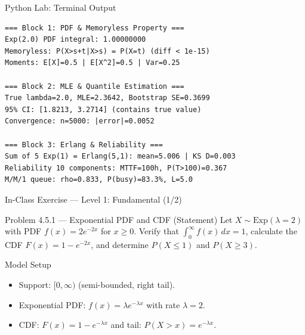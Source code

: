 \documentclass[aspectratio=169,xcolor={dvipsnames,table}]{beamer}
\begin{document}
\begin{frame}[fragile]{Python Lab: Terminal Output}
	\vspace{-0.1cm}
	\begin{block}{}
		\fontsize{4pt}{5pt}\selectfont
		\begin{verbatim}
=== Block 1: PDF & Memoryless Property ===
Exp(2.0) PDF integral: 1.00000000
Memoryless: P(X>s+t|X>s) = P(X=t) (diff < 1e-15)
Moments: E[X]=0.5 | E[X^2]=0.5 | Var=0.25

=== Block 2: MLE & Quantile Estimation ===
True lambda=2.0, MLE=2.3642, Bootstrap SE=0.3699
95% CI: [1.8213, 3.2714] (contains true value)
Convergence: n=5000: |error|=0.0052

=== Block 3: Erlang & Reliability ===
Sum of 5 Exp(1) = Erlang(5,1): mean=5.006 | KS D=0.003
Reliability 10 components: MTTF=100h, P(T>100)=0.367
M/M/1 queue: rho=0.833, P(busy)=83.3%, L=5.0
		\end{verbatim}
	\end{block}
\end{frame}

\begin{frame}{In-Class Exercise --- Level 1: Fundamental (1/2)}
	\vspace{-0.1cm}
	\begin{block}{Problem 4.5.1 --- Exponential PDF and CDF (Statement)}
		Let $X \sim \text{Exp}(\lambda = 2)$ with PDF $f(x) = 2e^{-2x}$ for $x \ge 0$. Verify that $\int_{0}^{\infty} f(x)\,dx = 1$, calculate the CDF $F(x) = 1 - e^{-2x}$, and determine $P(X \le 1)$ and $P(X \ge 3)$.
	\end{block}
	\vspace{0.15cm}
	\pause
	\begin{alertblock}{Model Setup}
		\begin{itemize}\itemsep=0.04cm
			\item Support: $[0, \infty)$ (semi-bounded, right tail).
			\item Exponential PDF: $f(x) = \lambda e^{-\lambda x}$ with rate $\lambda = 2$.
			\item CDF: $F(x) = 1 - e^{-\lambda x}$ and tail: $P(X > x) = e^{-\lambda x}$.
		\end{itemize}
	\end{alertblock}
\end{frame}
\end{document}
